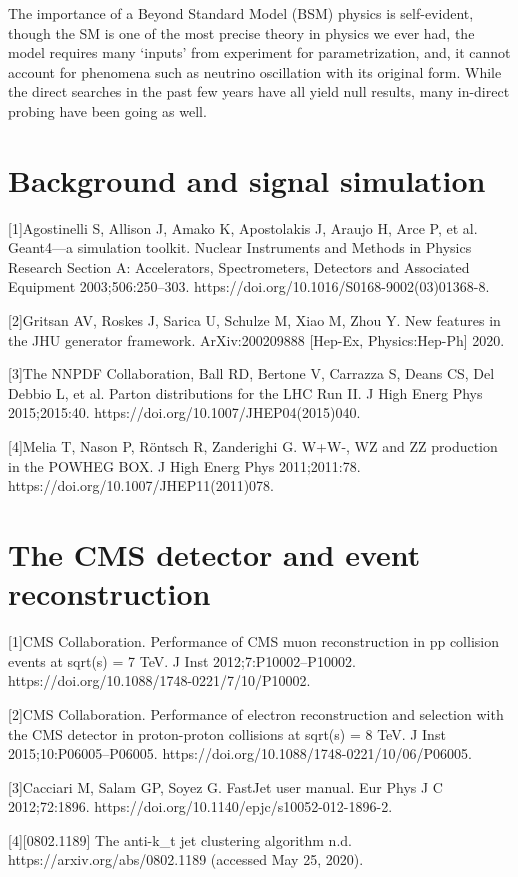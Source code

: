 The importance of a Beyond Standard Model (BSM) physics is self-evident, though the SM is one
of the most precise theory in physics we ever had, the model requires many `inputs' from experiment
for parametrization, and, it cannot account for phenomena such as neutrino oscillation with its
original form. While the direct searches in the past few years have all yield null results,
many in-direct probing have been going as well.
\newpage\phantom{blabla}
\newpage\phantom{blabla}


\section{Background and signal simulation}
[1]Agostinelli S, Allison J, Amako K, Apostolakis J, Araujo H, Arce P, et al. Geant4—a simulation toolkit. Nuclear Instruments and Methods in Physics Research Section A: Accelerators, Spectrometers, Detectors and Associated Equipment 2003;506:250–303. https://doi.org/10.1016/S0168-9002(03)01368-8.

[2]Gritsan AV, Roskes J, Sarica U, Schulze M, Xiao M, Zhou Y. New features in the JHU generator framework. ArXiv:200209888 [Hep-Ex, Physics:Hep-Ph] 2020.

[3]The NNPDF Collaboration, Ball RD, Bertone V, Carrazza S, Deans CS, Del Debbio L, et al. Parton distributions for the LHC Run II. J High Energ Phys 2015;2015:40. https://doi.org/10.1007/JHEP04(2015)040.

[4]Melia T, Nason P, Röntsch R, Zanderighi G. W+W-, WZ and ZZ production in the POWHEG BOX. J High Energ Phys 2011;2011:78. https://doi.org/10.1007/JHEP11(2011)078.

\newpage\phantom{blabla}
\newpage\phantom{blabla}


\section{The CMS detector and event reconstruction}
[1]CMS Collaboration. Performance of CMS muon reconstruction in pp collision events at sqrt(s) = 7 TeV. J Inst 2012;7:P10002–P10002. https://doi.org/10.1088/1748-0221/7/10/P10002.

[2]CMS Collaboration. Performance of electron reconstruction and selection with the CMS detector in proton-proton collisions at sqrt(s) = 8 TeV. J Inst 2015;10:P06005–P06005. https://doi.org/10.1088/1748-0221/10/06/P06005.

[3]Cacciari M, Salam GP, Soyez G. FastJet user manual. Eur Phys J C 2012;72:1896. https://doi.org/10.1140/epjc/s10052-012-1896-2.

[4][0802.1189] The anti-k\_t jet clustering algorithm n.d. https://arxiv.org/abs/0802.1189 (accessed May 25, 2020).


\newpage\phantom{blabla}
\newpage\phantom{blabla}
